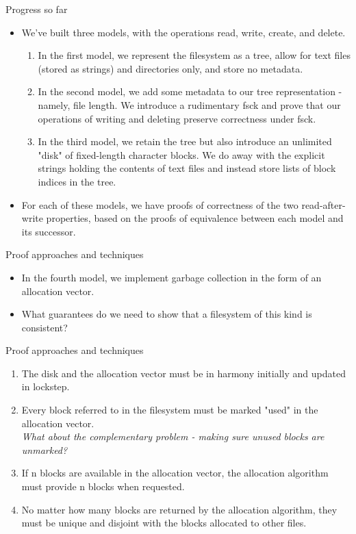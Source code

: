 \documentclass{beamer}
\begin{document}
\begin{frame}{Progress so far}
  \begin{itemize}
    \item We've built three models, with the operations read, write,
      create, and delete.
      \begin{enumerate}
      \item In the first model, we represent the filesystem as a tree,
        allow for text files (stored as strings) and directories only,
        and store no metadata.
      \item In the second model, we add some metadata to our tree
        representation - namely, file length. We introduce a
        rudimentary fsck and prove that our operations of writing and
        deleting preserve correctness under fsck.
      \item In the third model, we retain the tree but also introduce
        an unlimited "disk" of fixed-length character blocks. We do
        away with the explicit strings holding the contents of text
        files and instead store lists of block indices in the tree.
      \end{enumerate}
    \item For each of these models, we have proofs of correctness of
      the two read-after-write properties, based on the proofs of
      equivalence between each model and its successor.
  \end{itemize}
\end{frame}

\begin{frame}{Proof approaches and techniques}
  \begin{itemize}
  \item In the fourth model, we implement garbage collection in the
    form of an allocation vector.
  \item What guarantees do we need to show that a filesystem of this
    kind is consistent?
  \end{itemize}
\end{frame}

\begin{frame}{Proof approaches and techniques}
  \begin{enumerate}
  \item The disk and the allocation vector must be in harmony
    initially and updated in lockstep.
  \item Every block referred to in the filesystem must be marked
    "used" in the allocation vector.\\
    \textit{What about the complementary problem - making sure unused
      blocks are unmarked?}
  \item If n blocks are available in the allocation vector, the
    allocation algorithm must provide n blocks when requested.
  \item No matter how many blocks are returned by the allocation
    algorithm, they must be unique and disjoint with the blocks
    allocated to other files.
  \end{enumerate}
\end{frame}
\end{document}
